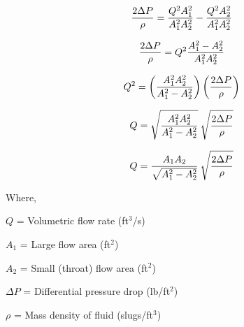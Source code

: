 $${2 \Delta P \over \rho} = {Q^2 A_1^2 \over A_1^2 A_2^2} - {Q^2 A_2^2 \over A_1^2 A_2^2}$$

$${2 \Delta P \over \rho} = Q^2 {A_1^2 - A_2^2 \over A_1^2 A_2^2}$$

$$Q^2 = \left({A_1^2 A_2^2 \over A_1^2 - A_2^2}\right) \left({2 \Delta P \over \rho}\right)$$

$$Q = \sqrt{A_1^2 A_2^2 \over A_1^2 - A_2^2} \> \sqrt{2 \Delta P \over \rho}$$

$$Q = {A_1 A_2 \over \sqrt{A_1^2 - A_2^2}} \> \sqrt{2 \Delta P \over \rho}$$


\noindent
Where,

$Q$ = Volumetric flow rate (ft$^{3}$/s)

$A_1$ = Large flow area (ft$^{2}$)

$A_2$ = Small (throat) flow area (ft$^{2}$)

$\Delta P$ = Differential pressure drop (lb/ft$^{2}$)

$\rho$ = Mass density of fluid (slugs/ft$^{3}$)

\vskip 10pt











